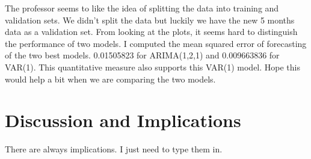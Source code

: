 \documentclass[twoside,twocolumn]{article}
\begin{document}
The professor seems to like the idea of splitting the data into training and validation sets. We didn't split the data but luckily we have the new 5 months data as a validation set. From looking at the plots, it seems hard to distinguish the performance of two models. I computed the mean squared error of forecasting of the two best models. 0.01505823 for ARIMA(1,2,1) and 0.009663836 for VAR(1). This quantitative measure also supports this VAR(1) model. Hope this would help a bit when we are comparing the two models.  

\section{Discussion and Implications}

There are always implications. I just need to type them in.


\begin{flushleft}
\end{flushleft}
 
\end{document}
